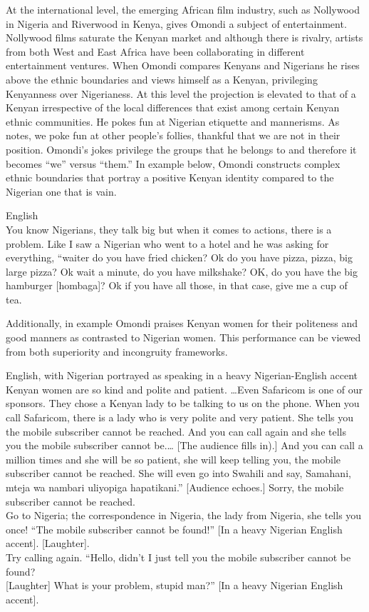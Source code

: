 \documentclass[output=paper]{langsci/langscibook}
\begin{document}
At the international level, the emerging African film industry, such as Nollywood in Nigeria and Riverwood in Kenya, gives Omondi a subject of entertainment. Nollywood films saturate the Kenyan market and although there is rivalry, artists from both West and East Africa have been collaborating in different entertainment ventures. When Omondi compares Kenyans and Nigerians he rises above the ethnic boundaries and views himself as a Kenyan, privileging Kenyanness over Nigerianess. At this level the projection is elevated to that of a Kenyan irrespective of the local differences that exist among certain Kenyan ethnic communities. He pokes fun at Nigerian etiquette and mannerisms. As \citet{Labrador2004} notes, we poke fun at other people’s follies, thankful that we are not in their position. Omondi’s jokes privilege the groups that he belongs to and therefore it becomes “we” versus “them.” In example  below, Omondi constructs complex ethnic boundaries that portray a positive Kenyan identity compared to the Nigerian one that is vain.

\ea\label{ex:muaka:4}
{English }\\
  You know Nigerians, they talk big but when it comes to actions, there is a problem. Like I saw a Nigerian who went to a hotel and he was asking for everything, “waiter do you have fried chicken? Ok do you have pizza, pizza, big large pizza? Ok wait a minute, do you have milkshake? OK, do you have the big hamburger \textup{[hombaga]}? Ok if you have all those, in that case, give me a cup of tea. \\
  \citep{Omogi2012a}
\z

Additionally, in example  Omondi praises Kenyan women for their politeness and good manners as contrasted to Nigerian women. This performance can be viewed from both superiority and incongruity frameworks.

\ea\label{ex:muaka:5}
{English, with Nigerian portrayed as speaking in a heavy Nigerian-English accent}\\
Kenyan women are so kind and polite and patient. …Even Safaricom is one of our sponsors. They chose a Kenyan lady to be talking to us on the phone. When you call Safaricom, there is a lady who is very polite and very patient. She tells you the mobile subscriber cannot be reached. And you can call again and she tells you the mobile subscriber cannot be.… \textup{[The audience fills in).]} And you can call a million times and she will be so patient, she will keep telling you, the mobile subscriber cannot be reached. She will even go into Swahili and say, Samahani, mteja wa nambari uliyopiga hapatikani.” \textup{[Audience echoes.]} Sorry, the mobile subscriber cannot be reached.\\
Go to Nigeria; the correspondence in Nigeria, the lady from Nigeria, she tells you 
once! “The mobile subscriber cannot be found!” \textup{ [In a heavy Nigerian English accent]. [Laughter].}\\
Try calling again. “Hello, didn’t I just tell you the mobile subscriber cannot be found? \\
\textup{[Laughter]} What is your problem, stupid man?” \textup{[In a heavy Nigerian English accent].}\\
 \citep{Omogi2012b}
\z
\end{document}
